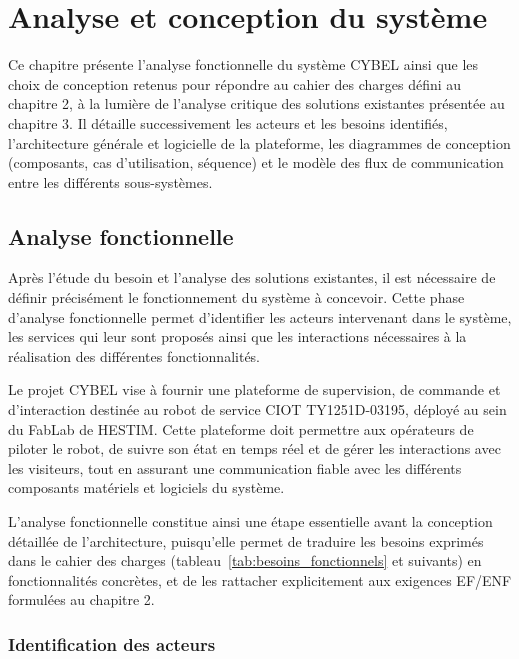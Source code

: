 \newpage
\section{Analyse et conception du système}
\label{chap:analyse_conception}

Ce chapitre présente l'analyse fonctionnelle du système CYBEL ainsi que les
choix de conception retenus pour répondre au cahier des charges défini au
chapitre 2, à la lumière de l'analyse critique des solutions existantes
présentée au chapitre 3. Il détaille successivement les acteurs et les
besoins identifiés, l'architecture générale et logicielle de la plateforme,
les diagrammes de conception (composants, cas d'utilisation, séquence) et
le modèle des flux de communication entre les différents sous-systèmes.

\subsection{Analyse fonctionnelle}

Après l'étude du besoin et l'analyse des solutions existantes, il est
nécessaire de définir précisément le fonctionnement du système à concevoir.
Cette phase d'analyse fonctionnelle permet d'identifier les acteurs
intervenant dans le système, les services qui leur sont proposés ainsi que
les interactions nécessaires à la réalisation des différentes
fonctionnalités.

Le projet CYBEL vise à fournir une plateforme de supervision, de commande
et d'interaction destinée au robot de service CIOT TY1251D-03195, déployé
au sein du FabLab de HESTIM. Cette plateforme doit permettre aux opérateurs
de piloter le robot, de suivre son état en temps réel et de gérer les
interactions avec les visiteurs, tout en assurant une communication fiable
avec les différents composants matériels et logiciels du système.

L'analyse fonctionnelle constitue ainsi une étape essentielle avant la
conception détaillée de l'architecture, puisqu'elle permet de traduire les
besoins exprimés dans le cahier des charges (tableau~\ref{tab:besoins_fonctionnels}
et suivants) en fonctionnalités concrètes, et de les rattacher explicitement
aux exigences EF/ENF formulées au chapitre 2.

\subsubsection{Identification des acteurs}

